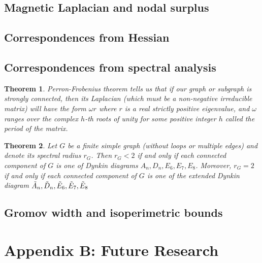 \documentclass{article}
\newtheorem{theorem}{Theorem}[section]
\theoremstyle{definition}
\begin{document}
\subsection{Magnetic Laplacian and nodal surplus}
\label{sec:magnetic-laplacian}

\subsection{Correspondences from Hessian}
\label{sec:hessian-corr}

\subsection{Correspondences from spectral analysis}
\label{sec:spectral-corr}

\begin{theorem}
    Perron-Frobenius theorem tells us that if our graph or subgraph is strongly connected, then its Laplacian (which must be a non-negative irreducible matrix) will have the form $\omega  r$ where $r$ is a real strictly positive eigenvalue, and $\omega$ ranges over the complex $h$-th roots of unity for some positive integer $h$ called the period of the matrix.
\end{theorem}

\begin{theorem}
    Let $G$ be a finite simple graph (without loops or multiple edges) and denote its spectral radius $r_G$. Then $r_G < 2$ if and only if each connected component of $G$ is one of Dynkin diagrams $A_n, D_n, E_6, E_7, E_8$. Moreover, $r_G = 2$ if and only if each connected component of $G$ is one of the extended Dynkin diagram $\Tilde{A}_n, \Tilde{D}_n, \Tilde{E}_6, \Tilde{E}_7, \Tilde{E}_8$
\end{theorem}

\subsection{Gromov width and isoperimetric bounds}
\label{sec:gromov-width}


\section{Appendix B: Future Research}
\end{document}
